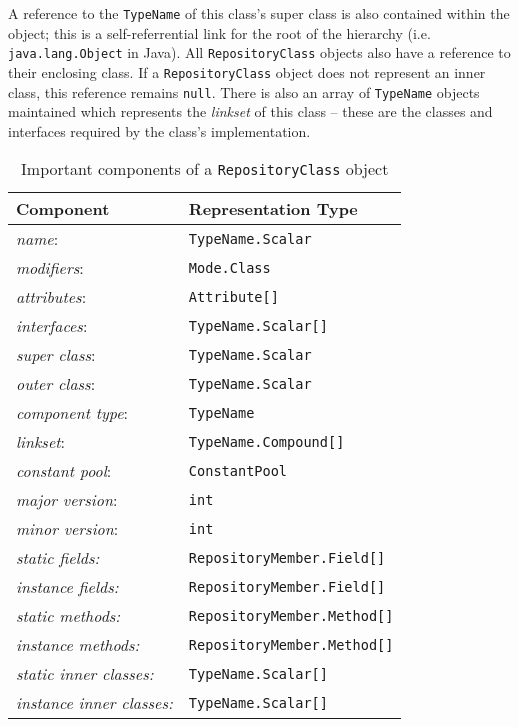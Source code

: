 \documentclass{report}
\begin{document}
A reference to the \texttt{TypeName} of this class's super class is also 
contained within the object; this is a self-referrential link for the root of 
the hierarchy (i.e. \texttt{java.lang.Object} in Java). All
\texttt{Re\-pos\-i\-tory\-Class} objects also have a reference to their 
enclosing class. If a \texttt{Re\-pos\-i\-tory\-Class} object does not 
represent an inner class, this reference remains \texttt{null}. There is also
an array of \texttt{TypeName} objects maintained which represents the 
{\em linkset} of this class -- these are the classes and interfaces 
required by the class's implementation.

\begin{table}
\begin{center}
\begin{small}
\begin{tabular}{l l} 
	Component & Representation Type \\ \hline
 	{\em name}: & \texttt{TypeName.Scalar} \\
	{\em modifiers}: & \texttt{Mode.Class}  \\	 
 	{\em attributes}: & \texttt{Attribute[]} \\
 	{\em interfaces}: & \texttt{TypeName.Scalar[]} \\
 	{\em super class}: & \texttt{TypeName.Scalar} \\
 	{\em outer class}: & \texttt{TypeName.Scalar} \\
 	{\em component type}: & \texttt{TypeName} \\
 	{\em linkset}: & \texttt{TypeName.Compound[]} \\
	{\em constant pool}: & \texttt{ConstantPool} \\
 	{\em major version}: & \texttt{int} \\
 	{\em minor version}: & \texttt{int} \\ %
	{\em static fields:} & 	\texttt{RepositoryMember.Field[]} \\
	{\em instance fields:} & \texttt{RepositoryMember.Field[]} \\
	{\em static methods:} & \texttt{RepositoryMember.Method[]} \\
	{\em instance methods:} & \texttt{RepositoryMember.Method[]} \\ 
	{\em static inner classes:} & \texttt{TypeName.Scalar[]} \\
	{\em instance inner classes:} & \texttt{TypeName.Scalar[]} \\
\end{tabular}
\end{small}
\caption{Important components of a \texttt{RepositoryClass} object}
\label{class_table}
\end{center}
\end{table}
\end{document}
